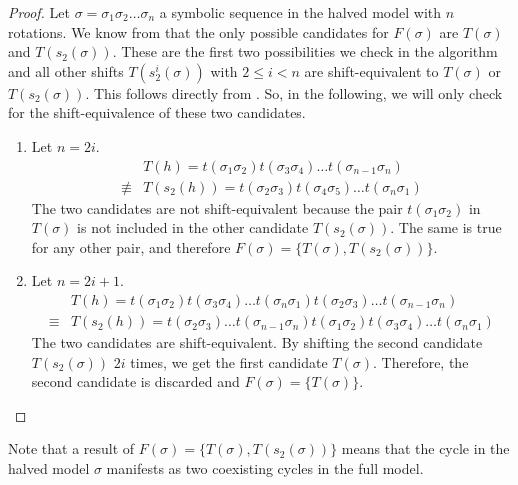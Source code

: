 \begin{proof}
    Let $\sigma = \sigma_1\sigma_2 \dots \sigma_n$ a symbolic sequence in the halved model with $n$ rotations.
    We know from  that the only possible candidates for $F(\sigma)$ are $T(\sigma)$ and $T(s_2(\sigma))$.
    These are the first two possibilities we check in the algorithm and all other shifts $T(s_2^i(\sigma))$ with $2 \leq i < n$ are shift-equivalent to $T(\sigma)$ or $T(s_2(\sigma))$.
    This follows directly from .
    So, in the following, we will only check for the shift-equivalence of these two candidates.
    \begin{enumerate}
        \item Let $n = 2i$.
              \begin{align*}
                          & T(h) = t(\sigma_1\sigma_2) t(\sigma_3\sigma_4) \dots t(\sigma_{n-1}\sigma_n) \\
                  \nequiv & T(s_2(h)) = t(\sigma_2\sigma_3) t(\sigma_4\sigma_5) \dots t(\sigma_n\sigma_1)
              \end{align*}
              The two candidates are not shift-equivalent because the pair $t(\sigma_1\sigma_2)$ in $T(\sigma)$ is not included in the other candidate $T(s_2(\sigma))$.
              The same is true for any other pair, and therefore $F(\sigma) = \{T(\sigma), T(s_2(\sigma))\}$.
        \item Let $n = 2i + 1$.
              \begin{align*}
                         & T(h) = t(\sigma_1\sigma_2) t(\sigma_3\sigma_4) \dots t(\sigma_n\sigma_1) t(\sigma_2\sigma_3) \dots t(\sigma_{n-1}\sigma_n) \\
                  \equiv & T(s_2(h)) = t(\sigma_2\sigma_3) \dots t(\sigma_{n-1}\sigma_n) t(\sigma_1\sigma_2) t(\sigma_3\sigma_4) \dots t(\sigma_n\sigma_1)
              \end{align*}
              The two candidates are shift-equivalent.
              By shifting the second candidate $T(s_2(\sigma))$ $2i$ times, we get the first candidate $T(\sigma)$.
              Therefore, the second candidate is discarded and $F(\sigma) = \{T(\sigma)\}$.
    \end{enumerate}
\end{proof}

Note that a result of $F(\sigma) = \{T(\sigma), T(s_2(\sigma))\}$ means that the cycle in the halved model $\sigma$ manifests as two coexisting cycles in the full model.

